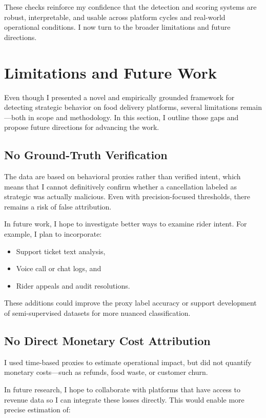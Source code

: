 \documentclass[12pt,letterpaper]{article}
\begin{document}
These checks reinforce my confidence that the detection and scoring systems are robust, interpretable, and usable across platform cycles and real-world operational conditions. I now turn to the broader limitations and future directions.

\section{Limitations and Future Work}

Even though I presented a novel and empirically grounded framework for detecting strategic behavior on food delivery platforms, several limitations remain—both in scope and methodology. In this section, I outline those gaps and propose future directions for advancing the work.

\subsection{No Ground-Truth Verification}

The data are based on behavioral proxies rather than verified intent, which means that I cannot definitively confirm whether a cancellation labeled as strategic was actually malicious. Even with precision-focused thresholds, there remains a risk of false attribution.

In future work, I hope to investigate better ways to examine rider intent. For example, I plan to incorporate:

\begin{itemize}
    \item Support ticket text analysis,
    \item Voice call or chat logs, and
    \item Rider appeals and audit resolutions.
\end{itemize}

These additions could improve the proxy label accuracy or support development of semi-supervised datasets for more nuanced classification.

\subsection{No Direct Monetary Cost Attribution}

I used time-based proxies to estimate operational impact, but did not quantify monetary costs—such as refunds, food waste, or customer churn.

In future research, I hope to collaborate with platforms that have access to revenue data so I can integrate these losses directly. This would enable more precise estimation of:
\end{document}
